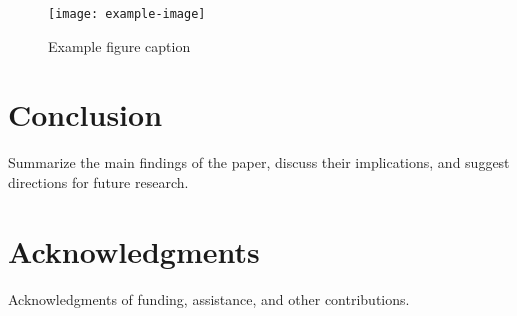 \documentclass[conference]{IEEEtran}
\begin{document}
\begin{figure}[h]
\centering
\texttt{[image: example-image]}
\caption{Example figure caption}
\label{fig:example}
\end{figure}

\section{Conclusion}
Summarize the main findings of the paper, discuss their implications, and suggest directions for future research.

\section*{Acknowledgments}
Acknowledgments of funding, assistance, and other contributions.



\end{document}
